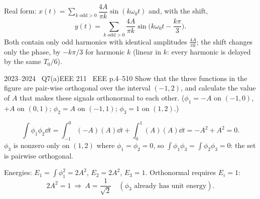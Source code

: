 \begin{solution}
\begin{center}
\end{center}
 Real form: $x(t)=\sum_{k\text{ odd}>0}\dfrac{4A}{\pi k}\sin(k\omega_0t)$ and, with the shift,
\[y(t)=\sum_{k\text{ odd}>0}\frac{4A}{\pi k}\sin\!\Big(k\omega_0t-\frac{k\pi}{3}\Big).\]
Both contain only odd harmonics with identical amplitudes $\frac{4A}{\pi k}$; the shift changes only the phase, by $-k\pi/3$ for harmonic $k$ (linear in $k$: every harmonic is delayed by the same $T_0/6$).
\end{solution}

\begin{qcard}{2023--2024 \textbullet\ Q7(a)}{EEE 211 \textbullet\ EEE p.4--5}{10}
Show that the three functions in the figure are pair-wise orthogonal over the interval $(-1,2)$, and calculate the value of $A$ that makes these signals orthonormal to each other. ($\phi_1=-A$ on $(-1,0)$, $+A$ on $(0,1)$; $\phi_2=A$ on $(-1,1)$; $\phi_3=1$ on $(1,2)$.)
\end{qcard}
\begin{solution}
\[\int\phi_1\phi_2\dd t=\int_{-1}^{0}(-A)(A)\dd t+\int_0^1(A)(A)\dd t=-A^2+A^2=0.\]
$\phi_3$ is nonzero only on $(1,2)$ where $\phi_1=\phi_2=0$, so $\int\phi_1\phi_3=\int\phi_2\phi_3=0$: the set is pairwise orthogonal.

Energies: $E_1=\int\phi_1^2=2A^2$, $E_2=2A^2$, $E_3=1$. Orthonormal requires $E_i=1$:
\[2A^2=1\ \Rightarrow\ A=\frac1{\sqrt2}\quad(\phi_3\text{ already has unit energy}).\]
\end{solution}

